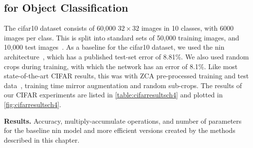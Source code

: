 \documentclass[thesis]{subfiles}
\begin{document}
    \subsection{ for  Object Classification}
    The \gls{cifar10} dataset consists of 60,000 $32\times 32$ images in 10 classes, with 6000 images per class. This is split into standard sets of 50,000 training images, and 10,000 test images~\citep{CIFAR10}. As a baseline for the \gls{cifar10} dataset, we used the \gls{nin} architecture~\citep{Lin2013NiN}, which has a published test-set error of 8.81\%. We also used random crops during training, with which the network has an error of 8.1\%. Like most state-of-the-art CIFAR results, this was with ZCA pre-processed training and test data~\citep{goodfellow2013maxout}, training time mirror augmentation and random sub-crops. The results of our CIFAR experiments are listed in \cref{table:cifarresultsch4} and plotted in \cref{fig:cifarresultsch4}.
    
    \begin{table}[tbp]
        \centering
        \caption[Low-rank  results]{\textbf{  Results.} Accuracy, multiply-accumulate operations, and number of parameters for the baseline \gls{nin} model and more efficient versions created by the methods described in this chapter.}
        \data
        \pgfplotstabletypeset[
        every head row/.style={
            before row=\toprule,after row=\midrule},
        every last row/.style={
            after row=\bottomrule},    
        every first row/.style={
            after row=\bottomrule},
        fixed zerofill,     %
        columns={Network, Multiply-Acc., Param., Accuracy},
        columns/Multiply-Acc./.style={
            column name=FLOPS {\small $\times 10^{8}$},
            preproc/expr={{##1/1e8}}
        },
        columns/Param./.style={
            column name=Param. {\small $\times 10^{5}$},
            preproc/expr={{##1/1e5}}
        },
        column type/.add={lrrr}{},
        columns/Network/.style={string type},
        columns/Accuracy/.style={precision=4}, 
        highlight col max ={\data}{Accuracy}, 
        highlight col min ={\data}{Param.}, 
        highlight col min ={\data}{Multiply-Acc.}, 
        col sep=comma]{\data}
        \label{table:cifarresultsch4}
    \end{table}
    
\end{document}

